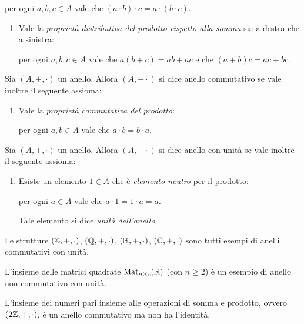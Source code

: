 \begin{definition}
\begin{enumerate}[label={(P)}]
\begin{enumerate}[label={(P\arabic*)}]
            per ogni $a, b, c \in A$ vale che $(a \cdot b) \cdot c = a \cdot (b \cdot c)$.
        \end{enumerate}
    \end{enumerate}
    \begin{enumerate}[label=(D)]
        \item \label{def:anello:distr} Vale la \emph{proprietà distributiva del prodotto rispetto alla somma} sia a destra che a sinistra:
         
        per ogni $a, b, c \in A$ vale che $a(b + c) = ab + ac$ e che $(a + b)c = ac + bc$.
    \end{enumerate}
\end{definition}

\begin{definition}
    \label{def:anello_comm}
    Sia $(A, +, \cdot)$ un anello. Allora $(A, + \cdot)$ si dice anello commutativo se vale inoltre il seguente assioma:
    \begin{enumerate}[label={(P\arabic*)}, start=2]
        \item \label{def:anello_prod:com} Vale la \emph{proprietà commutativa del prodotto}:
        
        per ogni $a, b \in A$ vale che $a \cdot b = b \cdot a$.
    \end{enumerate}
\end{definition}

\begin{definition}
    \label{def:anello_con_unit}
    Sia $(A, +, \cdot)$ un anello. Allora $(A, + \cdot)$ si dice anello con unità se vale inoltre il seguente assioma:
    \begin{enumerate}[label={(P\arabic*)}, start=2]
        \item \label{def:anello_prod:unit} Esiste un elemento $1 \in A$ che è \emph{elemento neutro} per il prodotto:
        
        per ogni $a \in A$ vale che $a \cdot 1 = 1 \cdot a = a$.

        Tale elemento si dice \emph{unità dell'anello}.
    \end{enumerate}
\end{definition}

\begin{example}
    Le strutture $(\mathbb{Z}, +, \cdot)$, $(\mathbb{Q}, +, \cdot)$, $(\mathbb{R}, +, \cdot)$, $(\mathbb{C}, +, \cdot)$ sono tutti esempi di anelli commutativi con unità.
\end{example}
\begin{example}
    L'insieme delle matrici quadrate $\Mat{n}{\R}$ (con $n \geq 2$) è un esempio di anello non commutativo con unità.
\end{example}
\begin{example}
    L'insieme dei numeri pari insieme alle operazioni di somma e prodotto, ovvero $(2\mathbb{Z}, +, \cdot)$, è un anello commutativo ma non ha l'identità.
\end{example}



